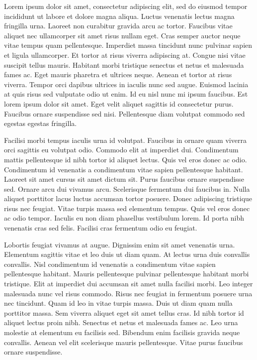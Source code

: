 \documentclass[
]{scrbook}
\begin{document}
Lorem ipsum dolor sit amet, consectetur adipiscing elit, sed do eiusmod tempor incididunt ut labore et dolore magna aliqua. Luctus venenatis lectus magna fringilla urna. Laoreet non curabitur gravida arcu ac tortor. Faucibus vitae aliquet nec ullamcorper sit amet risus nullam eget. Cras semper auctor neque vitae tempus quam pellentesque. Imperdiet massa tincidunt nunc pulvinar sapien et ligula ullamcorper. Et tortor at risus viverra adipiscing at. Congue nisi vitae suscipit tellus mauris. Habitant morbi tristique senectus et netus et malesuada fames ac. Eget mauris pharetra et ultrices neque. Aenean et tortor at risus viverra. Tempor orci dapibus ultrices in iaculis nunc sed augue. Euismod lacinia at quis risus sed vulputate odio ut enim. Id eu nisl nunc mi ipsum faucibus. Est lorem ipsum dolor sit amet. Eget velit aliquet sagittis id consectetur purus. Faucibus ornare suspendisse sed nisi. Pellentesque diam volutpat commodo sed egestas egestas fringilla.

Facilisi morbi tempus iaculis urna id volutpat. Faucibus in ornare quam viverra orci sagittis eu volutpat odio. Commodo elit at imperdiet dui. Condimentum mattis pellentesque id nibh tortor id aliquet lectus. Quis vel eros donec ac odio. Condimentum id venenatis a condimentum vitae sapien pellentesque habitant. Laoreet sit amet cursus sit amet dictum sit. Purus faucibus ornare suspendisse sed. Ornare arcu dui vivamus arcu. Scelerisque fermentum dui faucibus in. Nulla aliquet porttitor lacus luctus accumsan tortor posuere. Donec adipiscing tristique risus nec feugiat. Vitae turpis massa sed elementum tempus. Quis vel eros donec ac odio tempor. Iaculis eu non diam phasellus vestibulum lorem. Id porta nibh venenatis cras sed felis. Facilisi cras fermentum odio eu feugiat.

Lobortis feugiat vivamus at augue. Dignissim enim sit amet venenatis urna. Elementum sagittis vitae et leo duis ut diam quam. At lectus urna duis convallis convallis. Nisl condimentum id venenatis a condimentum vitae sapien pellentesque habitant. Mauris pellentesque pulvinar pellentesque habitant morbi tristique. Elit at imperdiet dui accumsan sit amet nulla facilisi morbi. Leo integer malesuada nunc vel risus commodo. Risus nec feugiat in fermentum posuere urna nec tincidunt. Quam id leo in vitae turpis massa. Duis ut diam quam nulla porttitor massa. Sem viverra aliquet eget sit amet tellus cras. Id nibh tortor id aliquet lectus proin nibh. Senectus et netus et malesuada fames ac. Leo urna molestie at elementum eu facilisis sed. Bibendum enim facilisis gravida neque convallis. Aenean vel elit scelerisque mauris pellentesque. Vitae purus faucibus ornare suspendisse.
\end{document}
